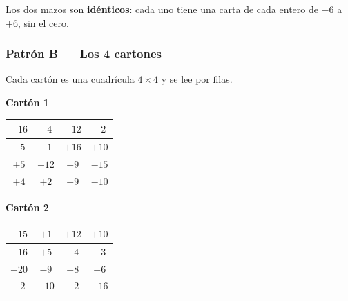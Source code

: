 \documentclass[12pt, letterpaper]{article}
\begin{document}
Los dos mazos son \textbf{idénticos}: cada uno tiene una carta de cada entero de $-6$ a $+6$, sin el cero.

\subsubsection{Patrón B — Los 4 cartones}

Cada cartón es una cuadrícula $4\times 4$ y se lee por filas.

\begin{center}
\begin{minipage}{0.46\linewidth}\centering\small
  \textbf{Cartón 1}\\[2pt]
  \begin{tabular}{|c|c|c|c|}\hline
    $-16$ & $-4$ & $-12$ & $-2$\\\hline
    $-5$ & $-1$ & $+16$ & $+10$\\\hline
    $+5$ & $+12$ & $-9$ & $-15$\\\hline
    $+4$ & $+2$ & $+9$ & $-10$\\\hline
  \end{tabular}
\end{minipage}\hfill
\begin{minipage}{0.46\linewidth}\centering\small
  \textbf{Cartón 2}\\[2pt]
  \begin{tabular}{|c|c|c|c|}\hline
    $-15$ & $+1$ & $+12$ & $+10$\\\hline
    $+16$ & $+5$ & $-4$ & $-3$\\\hline
    $-20$ & $-9$ & $+8$ & $-6$\\\hline
    $-2$ & $-10$ & $+2$ & $-16$\\\hline
  \end{tabular}
\end{minipage}
\end{center}

\vspace{6pt}
\end{document}
